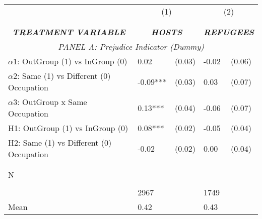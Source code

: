 \begin{tabular}{l*{4}{l}} \toprule 
                &\multicolumn{2}{c}{(1)}&\multicolumn{2}{c}{(2)}\\
                &\multicolumn{2}{c}{ } &\multicolumn{2}{c}{ } \\
\\[-0.6cm] \multicolumn{1}{c}{\textit{\textbf{TREATMENT VARIABLE}}} & \multicolumn{2}{c}{\textit{\textbf{HOSTS}}} & \multicolumn{2}{c}{\textit{\textbf{REFUGEES}}} \\  \multicolumn{5}{c}{\textit{PANEL A: Prejudice Indicator (Dummy)}} \\  \midrule  
$\alpha1$: OutGroup (1) vs InGroup (0)&     0.02   &   (0.03)&    -0.02   &   (0.06)\\
$\alpha2$: Same (1) vs Different (0) Occupation&    -0.09***&   (0.03)&     0.03   &   (0.07)\\
$\alpha3$: OutGroup x Same Occupation&     0.13***&   (0.04)&    -0.06   &   (0.07)\\
 
H1: OutGroup (1) vs InGroup (0)&     0.08***&   (0.02)&    -0.05   &   (0.04)\\
 
H2: Same (1) vs Different (0) Occupation&    -0.02   &   (0.02)&     0.00   &   (0.04)\\
 
\\\\[-0.5cm] N \\\\[-0.6cm]&     2967   &         &     1749   &         \\
Mean            &     0.42&         &     0.43&         \\
 
\bottomrule  \end{tabular}  
